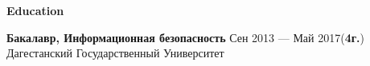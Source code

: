 \documentclass{resume}
\begin{document}

\begin{rSection}{\textbf{Education}}

    \textbf{Бакалавр, Информационная безопасность } \hfill {Сен 2013 --- Май 2017({\textbf{4г.}})} \\
    Дагестанский Государственный Университет

\end{rSection}
\end{document}
